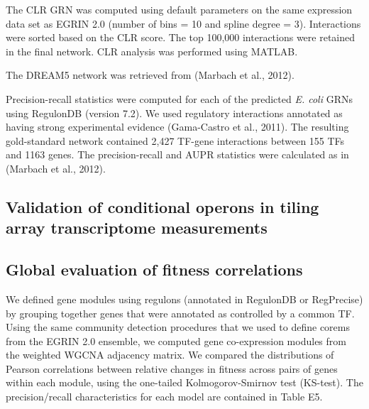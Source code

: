 The CLR GRN was computed using default parameters on the same
expression data set as EGRIN 2.0 (number of bins = 10 and spline
degree = 3). Interactions were sorted based on the CLR score. The top
100,000 interactions were retained in the final network. CLR analysis
was performed using MATLAB.

The DREAM5 network was retrieved from (Marbach et al., 2012).

Precision-recall statistics were computed for each of the predicted
{\it E. coli} GRNs using RegulonDB (version 7.2). We used regulatory
interactions annotated as having strong experimental evidence
(Gama-Castro et al., 2011). The resulting gold-standard network
contained 2,427 TF-gene interactions between 155 TFs and 1163
genes. The precision-recall and AUPR statistics were calculated as in
(Marbach et al., 2012).

\subsection{Validation of conditional operons in tiling array transcriptome measurements}

\subsection{Global evaluation of fitness correlations}

We defined gene modules using regulons (annotated in RegulonDB or
RegPrecise) by grouping together genes that were annotated as
controlled by a common TF. Using the same community detection
procedures that we used to define corems from the EGRIN 2.0 ensemble,
we computed gene co-expression modules from the weighted WGCNA
adjacency matrix. We compared the distributions of Pearson
correlations between relative changes in fitness across pairs of genes
within each module, using the one-tailed Kolmogorov-Smirnov test
(KS-test). The precision/recall characteristics for each model are
contained in Table E5.
